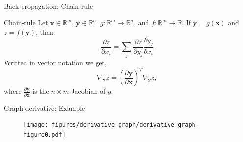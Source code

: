 \documentclass[]{beamer}
\begin{document}


\begin{frame}
   {Back-propagation: Chain-rule}
   \begin{block}
      {Chain-rule}
      Let $\boldsymbol{x} \in \mathbb{R}^m$, $\boldsymbol{y} \in \mathbb{R}^n$, $g: \mathbb{R}^m \rightarrow \mathbb{R}^n$, and $f: \mathbb{R}^m \rightarrow \mathbb{R}$.
      If $\boldsymbol{y} = g \left( \boldsymbol{x} \right)$ and $z = f \left( \boldsymbol{y} \right)$, then:
      \begin{equation*}
         \frac{\partial z}{\partial x_i} = \sum_j \frac{\partial z}{\partial y_j} \frac{\partial y_j}{\partial x_i}
      \end{equation*}
      Written in vector notation we get,
      \begin{equation*}
         \nabla_{\boldsymbol{x}} z = \left( \frac{\partial \boldsymbol{y}}{\partial \boldsymbol{x}} \right)^T \nabla_{\boldsymbol{y}} z,
      \end{equation*}
      where $\frac{\partial \boldsymbol{y}}{\partial \boldsymbol{x}}$ is the $n \times m$ Jacobian of $g$.
   \end{block}

\end{frame}

\begin{frame}
   {Graph derivative: Example}
   \begin{figure}
      \texttt{[image: figures/derivative\_graph/derivative\_graph-figure0.pdf]}
   \end{figure}
\end{frame}
\end{document}
